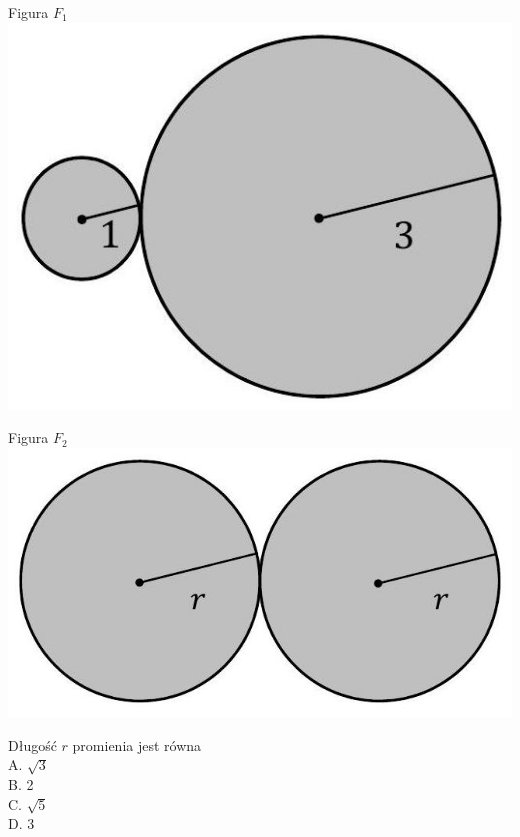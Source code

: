 \documentclass[10pt]{article}
\begin{document}
Figura \(F_{1}\)\\
\includegraphics[max width=\textwidth, center]{2024_11_21_46d945490f1b2eff1c8eg-12}

Figura \(F_{2}\)\\
\includegraphics[max width=\textwidth, center]{2024_11_21_46d945490f1b2eff1c8eg-12(1)}

Długość \(r\) promienia jest równa\\
A. \(\sqrt{3}\)\\
B. 2\\
C. \(\sqrt{5}\)\\
D. 3
\end{document}
